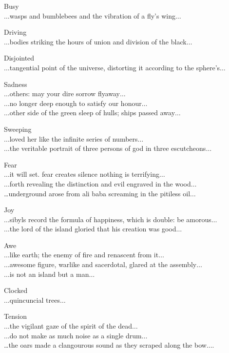 Busy\\
$\ldots$wasps and bumblebees and the vibration of a fly's wing$\ldots$

Driving\\
$\ldots$bodies striking the hours of union and division of the black$\ldots$

Disjointed\\
$\ldots$tangential point of the universe, distorting it according to the sphere's$\ldots$

Sadness\\
$\ldots$others: may your dire sorrow flyaway$\ldots$\\
$\ldots$no longer deep enough to satisfy our honour$\ldots$\\
$\ldots$other side of the green sleep of hulls; ships passed away$\ldots$

Sweeping\\
$\ldots$loved her like the infinite series of numbers$\ldots$\\
$\ldots$the veritable portrait of three persons of god in three escutcheons$\ldots$

Fear\\
$\ldots$it will set. fear creates silence nothing is terrifying$\ldots$\\
$\ldots$forth revealing the distinction and evil engraved in the wood$\ldots$\\
…underground arose from ali baba screaming in the pitiless oil$\ldots$

Joy\\
$\ldots$sibyls record the formula of happiness, which is double: be amorous$\ldots$\\
$\ldots$the lord of the island gloried that his creation was good$\ldots$

Awe\\
$\ldots$like earth; the enemy of fire and renascent from it$\ldots$\\
$\ldots$awesome figure, warlike and sacerdotal, glared at the assembly$\ldots$\\
$\ldots$is not an island but a man$\ldots$

Clocked\\
$\ldots$quincuncial trees$\ldots$

Tension\\
$\ldots$the vigilant gaze of the spirit of the dead$\ldots$\\
$\ldots$do not make as much noise as a single drum$\ldots$\\
…the oars made a clangourous sound as they scraped along the bow$\ldots$.

